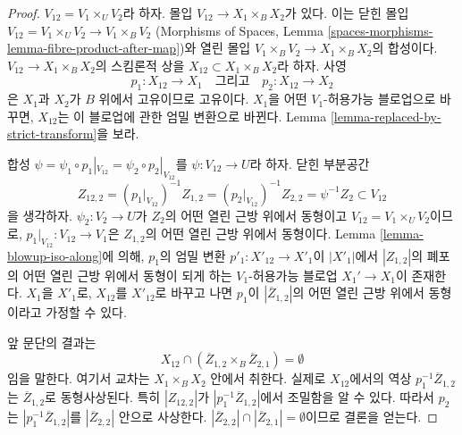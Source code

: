 \begin{proof}
\medskip\noindent
$V_{12} = V_1 \times_U V_2$라 하자. 몰입
$V_{12} \to X_1 \times_B X_2$가 있다. 이는 닫힌 몰입
$V_{12} = V_1 \times_U V_2 \to V_1 \times_B V_2$
(Morphisms of Spaces, Lemma
\ref{spaces-morphisms-lemma-fibre-product-after-map})와 열린 몰입
$V_1 \times_B V_2 \to X_1 \times_B X_2$의 합성이다.
$V_{12} \to X_1 \times_B X_2$의 스킴론적 상을
$X_{12} \subset X_1 \times_B X_2$라 하자. 사영
$$
p_1 : X_{12} \to X_1
\quad\text{그리고}\quad
p_2 : X_{12} \to X_2
$$
은 $X_1$과 $X_2$가 $B$ 위에서 고유이므로 고유이다.
$X_1$을 어떤 $V_1$-허용가능 블로업으로 바꾸면,
$X_{12}$는 이 블로업에 관한 엄밀 변환으로 바뀐다.
Lemma \ref{lemma-replaced-by-strict-transform}을 보라.

\medskip\noindent
합성
$\psi = \psi_1 \circ p_1|_{V_{12}} = \psi_2 \circ p_2|_{V_{12}}$를
$\psi : V_{12} \to U$라 하자. 닫힌 부분공간
$$
Z_{12, 2} =
(p_1|_{V_{12}})^{-1}Z_{1, 2} =
(p_2|_{V_{12}})^{-1}Z_{2, 2} =
\psi^{-1}Z_2 \subset V_{12}
$$
을 생각하자. $\psi_2 : V_2 \to U$가 $Z_2$의 어떤 열린 근방 위에서
동형이고 $V_{12} = V_1 \times_U V_2$이므로,
$p_1|_{V_{12}} : V_{12} \to V_1$은 $Z_{1, 2}$의 어떤 열린 근방
위에서 동형이다. Lemma \ref{lemma-blowup-iso-along}에 의해,
$p_1$의 엄밀 변환 $p'_1 : X'_{12} \to X'_1$이
$|X'_1|$에서 $|Z_{1, 2}|$의 폐포의 어떤 열린 근방 위에서 동형이
되게 하는 $V_1$-허용가능 블로업 $X_1' \to X_1$이 존재한다.
$X_1$을 $X'_1$로, $X_{12}$를 $X'_{12}$로 바꾸고 나면
$p_1$이 $|\overline{Z}_{1, 2}|$의 어떤 열린 근방 위에서 동형이라고
가정할 수 있다.

\medskip\noindent
앞 문단의 결과는
$$
X_{12} \cap (\overline{Z}_{1, 2} \times_B \overline{Z}_{2, 1}) = \emptyset
$$
임을 말한다. 여기서 교차는 $X_1 \times_B X_2$ 안에서 취한다.
실제로 $X_{12}$에서의 역상 $p_1^{-1}\overline{Z}_{1, 2}$는
$\overline{Z}_{1, 2}$로 동형사상된다. 특히 $|Z_{12, 2}|$가
$|p_1^{-1}\overline{Z}_{1, 2}|$에서 조밀함을 알 수 있다.
따라서 $p_2$는 $|p_1^{-1}\overline{Z}_{1, 2}|$를
$|\overline{Z}_{2, 2}|$ 안으로 사상한다.
$|\overline{Z}_{2, 2}| \cap |\overline{Z}_{2, 1}| = \emptyset$이므로
결론을 얻는다.


\end{proof}
